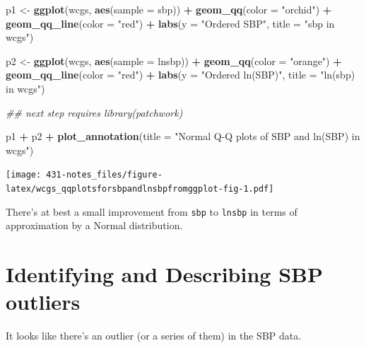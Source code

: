 \documentclass[
]{book}
\newenvironment{Shaded}{\begin{snugshade}}{\end{snugshade}}
\newcommand{\CommentTok}[1]{\textcolor[rgb]{0.56,0.35,0.01}{\textit{#1}}}
\newcommand{\DataTypeTok}[1]{\textcolor[rgb]{0.13,0.29,0.53}{#1}}
\newcommand{\KeywordTok}[1]{\textcolor[rgb]{0.13,0.29,0.53}{\textbf{#1}}}
\newcommand{\NormalTok}[1]{#1}
\newcommand{\OperatorTok}[1]{\textcolor[rgb]{0.81,0.36,0.00}{\textbf{#1}}}
\newcommand{\StringTok}[1]{\textcolor[rgb]{0.31,0.60,0.02}{#1}}
\begin{document}
\begin{Shaded}
\begin{Highlighting}[]
\NormalTok{p1 <-}\StringTok{ }\KeywordTok{ggplot}\NormalTok{(wcgs, }\KeywordTok{aes}\NormalTok{(}\DataTypeTok{sample =}\NormalTok{ sbp)) }\OperatorTok{+}
\StringTok{    }\KeywordTok{geom_qq}\NormalTok{(}\DataTypeTok{color =} \StringTok{"orchid"}\NormalTok{) }\OperatorTok{+}\StringTok{ }
\StringTok{    }\KeywordTok{geom_qq_line}\NormalTok{(}\DataTypeTok{color =} \StringTok{"red"}\NormalTok{) }\OperatorTok{+}
\StringTok{    }\KeywordTok{labs}\NormalTok{(}\DataTypeTok{y =} \StringTok{"Ordered SBP"}\NormalTok{, }\DataTypeTok{title =} \StringTok{"sbp in wcgs"}\NormalTok{)}

\NormalTok{p2 <-}\StringTok{ }\KeywordTok{ggplot}\NormalTok{(wcgs, }\KeywordTok{aes}\NormalTok{(}\DataTypeTok{sample =}\NormalTok{ lnsbp)) }\OperatorTok{+}
\StringTok{    }\KeywordTok{geom_qq}\NormalTok{(}\DataTypeTok{color =} \StringTok{"orange"}\NormalTok{) }\OperatorTok{+}\StringTok{ }
\StringTok{    }\KeywordTok{geom_qq_line}\NormalTok{(}\DataTypeTok{color =} \StringTok{"red"}\NormalTok{) }\OperatorTok{+}
\StringTok{    }\KeywordTok{labs}\NormalTok{(}\DataTypeTok{y =} \StringTok{"Ordered ln(SBP)"}\NormalTok{, }\DataTypeTok{title =} \StringTok{"ln(sbp) in wcgs"}\NormalTok{)}

\CommentTok{## next step requires library(patchwork)}

\NormalTok{p1 }\OperatorTok{+}\StringTok{ }\NormalTok{p2 }\OperatorTok{+}\StringTok{ }
\StringTok{    }\KeywordTok{plot_annotation}\NormalTok{(}\DataTypeTok{title =} \StringTok{"Normal Q-Q plots of SBP and ln(SBP) in wcgs"}\NormalTok{)}
\end{Highlighting}
\end{Shaded}

\texttt{[image: 431-notes\_files/figure-latex/wcgs\_qqplotsforsbpandlnsbpfromggplot-fig-1.pdf]}

There's at best a small improvement from \texttt{sbp} to \texttt{lnsbp} in terms of approximation by a Normal distribution.

\hypertarget{identifying-and-describing-sbp-outliers}{%
\section{Identifying and Describing SBP outliers}\label{identifying-and-describing-sbp-outliers}}

It looks like there's an outlier (or a series of them) in the SBP data.
\end{document}
